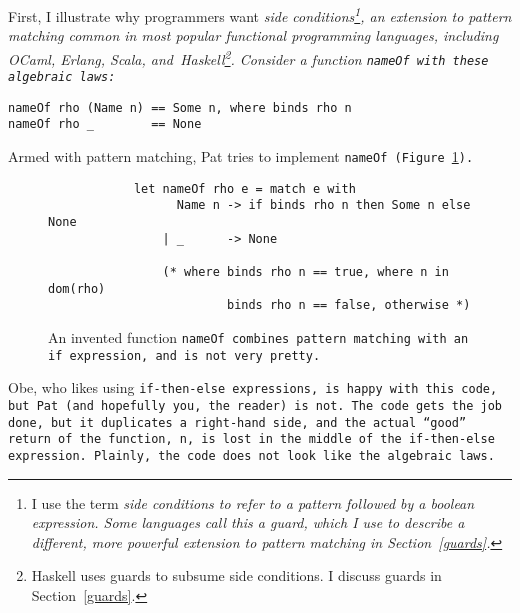 \documentclass[manuscript,screen,review, 12pt]{acmart}
\begin{document}
\begin{outline}[enumerate]
    First, I illustrate why programmers want \it{side conditions}\footnote{I
    use the term \it{side conditions} to refer to a pattern followed by a
    boolean expression. Some languages call this a \it{guard}, which I use to
    describe a different, more powerful extension to pattern matching in
    Section~\ref{guards}.}, an extension to pattern matching common in most
    popular functional programming languages, including OCaml, Erlang, Scala,
    and~Haskell\footnote{Haskell uses guards to subsume side conditions. I
    discuss guards in Section~\ref{guards}.}. Consider a function \tt{nameOf}
    with these algebraic laws: 

    \begin{minipage}[t]{\textwidth}
        \centering 
        \begin{verbatim}
nameOf rho (Name n) == Some n, where binds rho n
nameOf rho _        == None 
        \end{verbatim}
    \end{minipage}

    Armed with pattern matching, Pat tries to implement \tt{nameOf}
    (Figure~\ref{fig:ifnameof}).

    \begin{figure}[ht]
        \begin{verbatim}
            let nameOf rho e = match e with 
                  Name n -> if binds rho n then Some n else None
                | _      -> None

                (* where binds rho n == true, where n in dom(rho)
                         binds rho n == false, otherwise *)
            \end{verbatim}    
        \caption{An invented function \tt{nameOf} combines pattern matching with
        an \tt{if} expression, and is not very pretty.}    
        \label{fig:ifnameof}
    \end{figure}
    
    Obe, who likes using \tt{if-then-else} expressions, is happy with this code,
    but Pat (and hopefully you, the reader) is not. The code gets the job done,
    but it duplicates a right-hand side, and the actual “good” return of the
    function, \tt{n}, is lost in the middle of the \tt{if-then-else} expression.
    Plainly, the code does not look like the algebraic laws. 
    

\end{outline}
\end{document}
